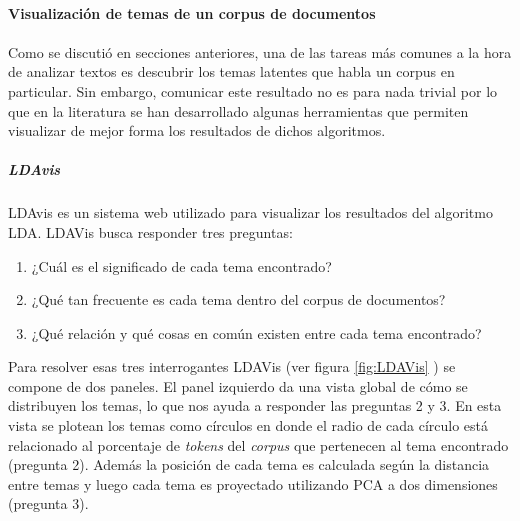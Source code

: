 \paragraph{Visualización de temas de un corpus de documentos}
\paragraph*{}
    Como se discutió en secciones anteriores, una de las tareas más comunes a la hora de analizar textos es descubrir los temas latentes que habla un corpus en particular. Sin embargo, comunicar este resultado no es para nada trivial por lo que en la literatura se han desarrollado algunas herramientas que permiten visualizar de mejor forma los resultados de dichos algoritmos.
\subparagraph{LDAvis}
\subparagraph*{}
    LDAvis \cite{sievert2014ldavis} es un sistema web utilizado para visualizar los resultados del algoritmo LDA. LDAVis  busca responder tres preguntas: 
    \begin{enumerate}
        \item ¿Cuál es el significado de cada tema encontrado?
        \item ¿Qué tan frecuente es cada tema dentro del corpus de documentos?
        \item ¿Qué relación y qué cosas en común existen entre cada tema encontrado?
    \end{enumerate}
    Para resolver esas tres interrogantes LDAVis (ver figura \ref{fig:LDAVis} ) se compone de dos paneles. El panel izquierdo da una vista global de cómo se distribuyen los temas, lo que nos ayuda a responder las preguntas 2 y 3. En esta vista se plotean los temas como círculos en donde el radio de cada círculo está relacionado al porcentaje de \textit{tokens} del \textit{corpus} que pertenecen al tema encontrado (pregunta 2). Además la posición de cada tema es calculada según la distancia entre temas y luego cada tema es proyectado utilizando PCA a dos dimensiones (pregunta 3). 
    
